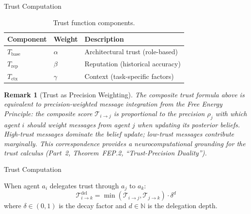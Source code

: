 \documentclass[
  ignorenonframetext,
]{beamer}
\newtheorem{remark}[theorem]{Remark}
\begin{document}
\begin{frame}[allowframebreaks]{Trust Computation}
\begin{table}[htbp]
\centering
\caption{Trust function components.}
\label{tab:trust-components}
\begin{tabular}{@{}llp{5cm}@{}}
\toprule
Component & Weight & Description \\
\midrule
$T_{\text{base}}$ & $\alpha$ & Architectural trust (role-based) \\
$T_{\text{rep}}$ & $\beta$ & Reputation (historical accuracy) \\
$T_{\text{ctx}}$ & $\gamma$ & Context (task-specific factors) \\
\bottomrule
\end{tabular}
\end{table}

\begin{remark}[Trust as Precision Weighting]
\label{rem:trust-precision}
The composite trust formula above is equivalent to precision-weighted
message integration from the Free Energy Principle: the composite score
$\mathcal{T}_{i\to j}$ is proportional to the precision $\rho_j$ with
which agent $i$ should weight messages from agent $j$ when updating its
posterior beliefs.  High-trust messages dominate the belief update;
low-trust messages contribute marginally.  This correspondence provides a
neurocomputational grounding for the trust calculus (Part~2, Theorem~FEP.2, ``Trust-Precision Duality'').
\end{remark}

\end{frame}

\begin{frame}[allowframebreaks]{Trust Computation}
\begin{definition}
\label{def:trust-delegation}
When agent $a_i$ delegates trust through $a_j$ to $a_k$:
\begin{equation}
\label{eq:trust-delegation}
\mathcal{T}_{i \to k}^{\text{del}} = \min(\mathcal{T}_{i \to j}, \mathcal{T}_{j \to k}) \cdot \delta^d
\end{equation}
where $\delta \in (0, 1)$ is the decay factor and $d \in \mathbb{N}$ is the delegation depth.
\end{definition}
\end{frame}
\end{document}

